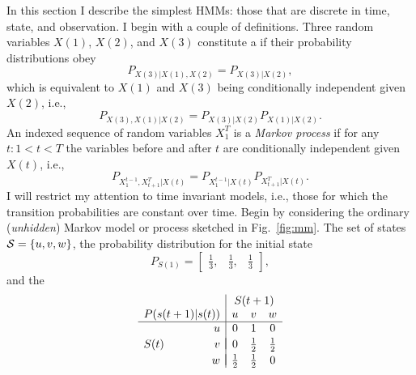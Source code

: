 \documentclass[]{article}
\newcommand{\ts}[3]{#1_{#2}^{#3}}                    %
\newcommand{\ti}[2]{{#1}{(#2)}}                  %
\newcommand{\states}{{\cal S}}
\newcommand{\ie}{i.e.\xspace}
\begin{document}
In this section I describe the simplest HMMs: those that are
discrete in time, state, and observation.  I begin with a couple of
definitions.  Three random variables $\ti{X}{1}$, $\ti{X}{2}$, and
$\ti{X}{3}$ constitute a \emph{} if their
probability distributions obey
\begin{equation}
  \label{eq:MarkovChain}
  P_{\ti{X}{3}|\ti{X}{1},\ti{X}{2}} = P_{\ti{X}{3}|\ti{X}{2}},
\end{equation}
which is equivalent to $\ti{X}{1}$ and $\ti{X}{3}$ being conditionally
independent given $\ti{X}{2}$, \ie,
\begin{equation*}
  P_{\ti{X}{3},\ti{X}{1}|\ti{X}{2}} = P_{\ti{X}{3}|\ti{X}{2}}   P_{\ti{X}{1}|\ti{X}{2}}.
\end{equation*}
An indexed sequence of random variables $\ts{X}{1}{T}$ is a
\emph{Markov process}  if
for any $t: 1 < t < T$ the variables before and after $t$ are
conditionally independent given $\ti{X}{t}$, \ie,
\begin{equation}
  \label{eq:MarkovProcess}
  P_{\ts{X}{1}{t-1},\ts{X}{t+1}{T}|\ti{X}{t}} =
  P_{\ts{X}{1}{t-1}|\ti{X}{t}} P_{\ts{X}{t+1}{T}|\ti{X}{t}}.
\end{equation}
I will restrict my attention to time invariant models, \ie, those
for which the transition probabilities are constant over time.
Begin by considering the ordinary (\emph{unhidden})
Markov model or process sketched in Fig.~\ref{fig:mm}.  The set of
states $\states = \left\{u,v,w\right\}$, the probability distribution
for the initial state
\begin{equation}
  \label{eq:InitialProbabilites}
P_{\ti{S}{1}} =
\begin{bmatrix}
  \frac{1}{3}, & \frac{1}{3}, & \frac{1}{3}
\end{bmatrix},
\end{equation}
and the  %
%
\begin{equation}
  \label{eq:TransitionMatrix}
\begin{array}{rr|ccc}
  && \multicolumn{3}{c}{\ti{S}{t+1}} \\
  \multicolumn{2}{c|}{P(\ti{s}{t+1}|\ti{s}{t})} & u & v & w \\ \hline
  & u & 0 & 1 & 0 \\  && \vspace{-1 em} \\
  \ti{S}{t} & v & 0 & \frac{1}{2} & \frac{1}{2} \\  && \vspace{-0.98 em} \\
  & w & \frac{1}{2} & \frac{1}{2} & 0
\end{array}
\end{equation}
\end{document}
